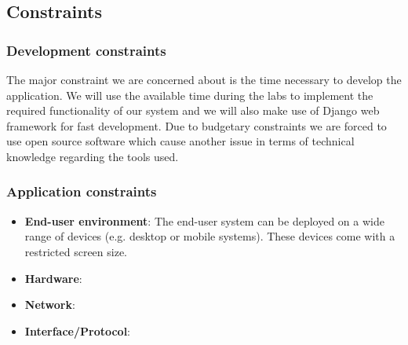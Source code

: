 \documentclass{sig-alt-release2}
\begin{document}
\subsection{Constraints}

\subsubsection{Development constraints}

The major constraint we are concerned about is the time necessary to develop 
the application. We will use the available time during the labs to implement 
the required functionality of our system and we will also make use of Django 
web framework for fast development. Due to budgetary constraints we are forced 
to use open source software which cause another issue in terms of technical 
knowledge regarding the tools used.

\subsubsection{Application constraints}
\begin{itemize}
	\item \textbf{End-user environment}: The end-user system can be deployed
	on a wide range of devices (e.g. desktop or mobile systems). These devices
	come with a restricted screen size.
	\item \textbf{Hardware}: 
	\item \textbf{Network}:
	\item \textbf{Interface/Protocol}:
\end{itemize}
\end{document}
